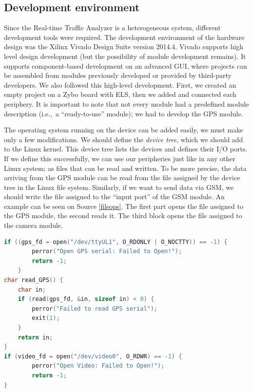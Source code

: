 \documentclass[b5paper,12pt]{report}
\theoremstyle{definition}
\begin{document}
\subsection{Development environment}
\label{dev}

Since the Real-time Traffic Analyzer is a heterogeneous system, different development tools were required. The development environment of the hardware design was the Xilinx Vivado Design Suite version 2014.4. Vivado supports high level design development (but the possibility of module development remains). It supports component-based development on an advanced GUI, where projects can be assembled from modules previously developed or provided by third-party developers. We also followed this high-level development. First, we created an empty project on a Zybo board with ELS, then we added and connected each periphery. It is important to note that not every module had a predefined module description (i.e.,~a \enquote{ready-to-use} module); we had to develop the GPS module.

The operating system running on the device can be added easily, we must make only a few modifications. We should define the \textit{device tree}, which we should add to the Linux kernel. This device tree lists the devices and defines their I/O ports. If we define this successfully, we can use our peripheries just like in any other Linux system; as files that can be read and written. To be more precise, the data arriving from the GPS module can be read from the file assigned by the device tree in the Linux file system. Similarly, if we want to send data via GSM, we should write the file assigned to the \enquote{input port} of the GSM module. An example can be seen on Source \ref{fileops}. The first part opens the file assigned to the GPS module, the second reads it. The third block opens the file assigned to the camera module.

\begin{lstlisting}[language=C,caption=File operations in the software., label=fileops]
if ((gps_fd = open("/dev/ttyUL1", O_RDONLY | O_NOCTTY)) == -1) {
        perror("Open GPS serial: Failed to Open!");
        return -1;
    }
char read_GPS() {
    char in;
    if (read(gps_fd, &in, sizeof in) < 0) {
        perror("Failed to read GPS serial");
        exit(1);
    }
    return in;
}
if (video_fd = open("/dev/video0", O_RDWR) == -1) {
        perror("Open Video: Failed to Open!");
        return -1;
}
\end{lstlisting}
\end{document}
